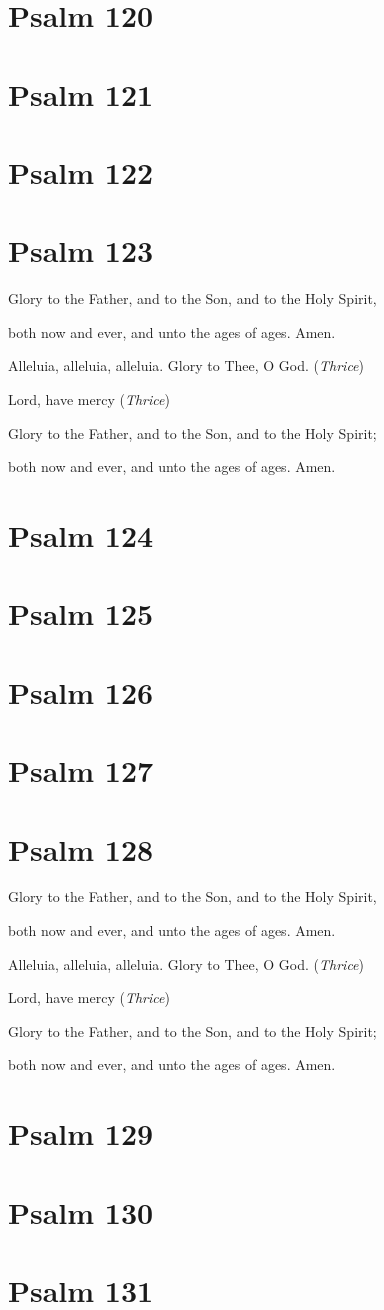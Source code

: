 \documentclass[12pt,openany]{book}
\newcommand{\kathismabreak}{
  \medskip
  \begin{center}
  \begin{footnotesize}
  Glory to the Father, and to the Son, and to the Holy Spirit,
  
  both now and ever, and unto the ages of ages. Amen.

  Alleluia, alleluia, alleluia. Glory to Thee, O God. (\textit{Thrice})

  Lord, have mercy (\textit{Thrice})

  Glory to the Father, and to the Son, and to the Holy Spirit;
  
  both now and ever, and unto the ages of ages. Amen.
  \end{footnotesize}
  \end{center}
  \smallbreak
}
\begin{document}
\section{Psalm 120}

\smallskip
\section{Psalm 121}

\smallskip
\section{Psalm 122}

\smallskip
\section{Psalm 123}


\pagebreak %
\kathismabreak
\smallskip

\section{Psalm 124}

\smallskip
\section{Psalm 125}

\smallskip
\section{Psalm 126}

\smallskip
\section{Psalm 127}

\smallskip
\section{Psalm 128}


\kathismabreak
\smallskip
\section{Psalm 129}

\smallskip
\section{Psalm 130}

\smallskip
\section{Psalm 131}

\smallskip
\pagebreak %
\end{document}
